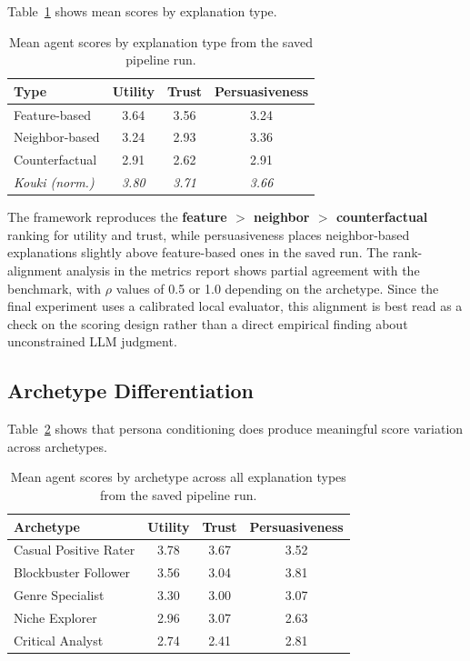 \documentclass[sigconf,nonacm]{acmart}
\begin{document}
Table~\ref{tab:explanation_scores} shows mean scores by explanation type.

\begin{table}[t]
\caption{Mean agent scores by explanation type from the saved pipeline run.}
\label{tab:explanation_scores}
\small
\begin{tabular}{lccc}
\toprule
\textbf{Type} & \textbf{Utility} & \textbf{Trust} & \textbf{Persuasiveness} \\
\midrule
Feature-based & 3.64 & 3.56 & 3.24 \\
Neighbor-based & 3.24 & 2.93 & 3.36 \\
Counterfactual & 2.91 & 2.62 & 2.91 \\
\midrule
\textit{Kouki (norm.)} & \textit{3.80} & \textit{3.71} & \textit{3.66} \\
\bottomrule
\end{tabular}
\end{table}

The framework reproduces the \textbf{feature $>$ neighbor $>$ counterfactual} ranking for utility and trust, while persuasiveness places neighbor-based explanations slightly above feature-based ones in the saved run. The rank-alignment analysis in the metrics report shows partial agreement with the benchmark, with $\rho$ values of 0.5 or 1.0 depending on the archetype. Since the final experiment uses a calibrated local evaluator, this alignment is best read as a check on the scoring design rather than a direct empirical finding about unconstrained LLM judgment.

\subsection{Archetype Differentiation}

Table~\ref{tab:archetype_scores} shows that persona conditioning does produce meaningful score variation across archetypes.

\begin{table}[t]
\caption{Mean agent scores by archetype across all explanation types from the saved pipeline run.}
\label{tab:archetype_scores}
\small
\begin{tabular}{lccc}
\toprule
\textbf{Archetype} & \textbf{Utility} & \textbf{Trust} & \textbf{Persuasiveness} \\
\midrule
Casual Positive Rater & 3.78 & 3.67 & 3.52 \\
Blockbuster Follower & 3.56 & 3.04 & 3.81 \\
Genre Specialist & 3.30 & 3.00 & 3.07 \\
Niche Explorer & 2.96 & 3.07 & 2.63 \\
Critical Analyst & 2.74 & 2.41 & 2.81 \\
\bottomrule
\end{tabular}
\end{table}
\end{document}
